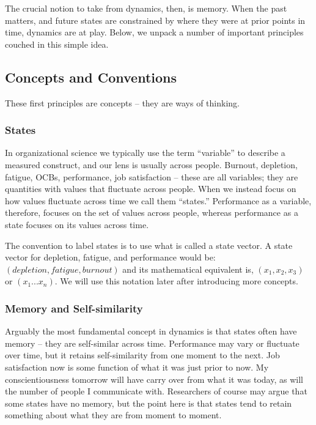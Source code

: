 \documentclass[english,,man]{apa6}
\theoremstyle{definition}
\theoremstyle{definition}
\theoremstyle{definition}
\theoremstyle{remark}
\begin{document}
The crucial notion to take from dynamics, then, is memory. When the past
matters, and future states are constrained by where they were at prior
points in time, dynamics are at play. Below, we unpack a number of
important principles couched in this simple idea.

\hypertarget{concepts-and-conventions}{%
\subsection{Concepts and Conventions}\label{concepts-and-conventions}}

These first principles are concepts -- they are ways of thinking.

\hypertarget{states}{%
\subsubsection{States}\label{states}}

In organizational science we typically use the term \enquote{variable}
to describe a measured construct, and our lens is usually across people.
Burnout, depletion, fatigue, OCBs, performance, job satisfaction --
these are all variables; they are quantities with values that fluctuate
across people. When we instead focus on how values fluctuate across time
we call them \enquote{states.} Performance as a variable, therefore,
focuses on the set of values across people, whereas performance as a
state focuses on its values across time.

The convention to label states is to use what is called a state vector.
A state vector for depletion, fatigue, and performance would be:
\((depletion, fatigue, burnout)\) and its mathematical equivalent is,
\((x_1, x_2, x_3)\) or \((x_1 ...x_n)\). We will use this notation later
after introducing more concepts.

\hypertarget{memory-and-self-similarity}{%
\subsubsection{Memory and
Self-similarity}\label{memory-and-self-similarity}}

Arguably the most fundamental concept in dynamics is that states often
have memory -- they are self-similar across time. Performance may vary
or fluctuate over time, but it retains self-similarity from one moment
to the next. Job satisfaction now is some function of what it was just
prior to now. My conscientiousness tomorrow will have carry over from
what it was today, as will the number of people I communicate with.
Researchers of course may argue that some states have no memory, but the
point here is that states tend to retain something about what they are
from moment to moment.
\end{document}

